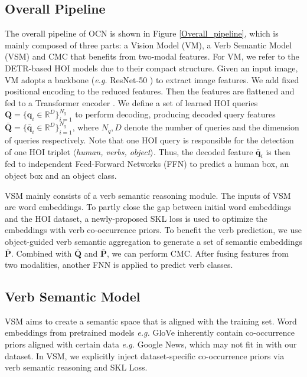 \documentclass[letterpaper]{article} %
\begin{document}
\subsection{Overall Pipeline}
The overall pipeline of OCN is shown in Figure \ref{Overall_pipeline}, which is mainly composed of three parts: a Vision Model (VM), a Verb Semantic Model (VSM) and CMC that benefits from two-modal features. For VM, we refer to the DETR-based HOI models \cite{zou2021HOITransformer,tamura2021qpic} due to their compact structure. Given an input image, VM adopts a backbone (\textit{e.g.} ResNet-50 \cite{he2016resnet}) to extract image features. We add fixed positional encoding \cite{gehring2017SeqtoSeq} to the reduced features. Then the features are flattened and fed to a Transformer encoder \cite{AttentionAlluNeed}. We define a set of learned HOI queries $\bm{Q} = \{\bm{q}_i \in \mathbb{R}^{D}\}_{i=1}^{N_q}$ to perform decoding, producing decoded query features $\bar{\bm{Q}} = \{\bar{\bm{q}}_i \in \mathbb{R}^{D}\}_{i=1}^{N_q}$, where $N_q, D$ denote the number of queries and the dimension of queries respectively. Note that one HOI query is responsible for the detection of one HOI triplet \textit{$\langle$human, verbs, object$\rangle$}. Thus, the decoded feature $\bar{\bm{q}}_i$ is then fed to independent Feed-Forward Networks (FFN) to predict a human box, an object box and an object class. 

VSM mainly consists of a verb semantic reasoning module. The inputs of VSM are word embeddings. To partly close the gap between initial word embeddings and the HOI dataset, a newly-proposed SKL loss is used to optimize the embeddings with verb co-occurrence priors. To benefit the verb prediction, we use object-guided verb semantic aggregation to generate a set of semantic embeddings $\bar{\bm{P}}$. Combined with $\bar{\bm{Q}}$ and $\bar{\bm{P}}$, we can perform CMC. After fusing features from two modalities, another FNN is applied to predict verb classes.


\subsection{Verb Semantic Model}
VSM aims to create a semantic space that is aligned with the training set. Word embeddings from pretrained models \textit{e.g.} GloVe \cite{pennington2014glove} inherently contain co-occurrence priors aligned with certain data \textit{e.g.} Google News, which may not fit in with our dataset. In VSM, we explicitly inject dataset-specific co-occurrence priors via verb semantic reasoning and SKL Loss.
\end{document}
